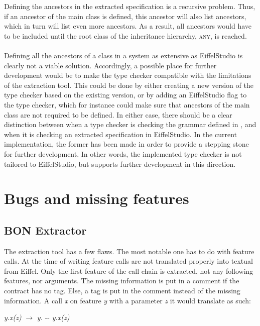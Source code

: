Defining the ancestors in the extracted specification is a recursive problem. Thus, if an ancestor of the main class is defined, this ancestor will also list ancestors, which in turn will list even more ancestors. As a result, all ancestors would have to be included until the root class of the inheritance hierarchy, \textsc{any}, is reached. 
\paragraph{}
Defining all the ancestors of a class in a system as extensive as EiffelStudio is clearly not a viable solution. Accordingly, a possible place for further development would be to make the type checker compatible with the limitations of the extraction tool. This could be done by either creating a new version of the type checker based on the existing version, or by adding an EiffelStudio flag to the type checker, which for instance could make sure that ancestors of the main class are not required to be defined. In either case, there should be a clear distinction between when a type checker is checking the grammar defined in \cite{walden1995}, and when it is checking an extracted specification in EiffelStudio. In the current implementation, the former has been made in order to provide a stepping stone for further development. In other words, the implemented type checker is not tailored to EiffelStudio, but supports further development in this direction.

\section{Bugs and missing features}
\subsection{BON Extractor}
\label{bugs_bon_extractors}
The \bon{} extraction tool has a few flaws. The most notable one has to do with feature calls. At the time of writing feature calls are not translated properly into textual \bon{} from Eiffel. Only the first feature of the call chain is extracted, not any following features, nor arguments. The missing information is put in a comment if the contract has no tag. Else, a tag is put in the comment instead of the missing information. A call \textit{x} on feature \textit{y} with a parameter \textit{z} it would translate as such:
\begin{center}
\textit{y.x(z)} $\rightarrow$ \textit{y.} -\-- \textit{y.x(z)}
\end{center}

